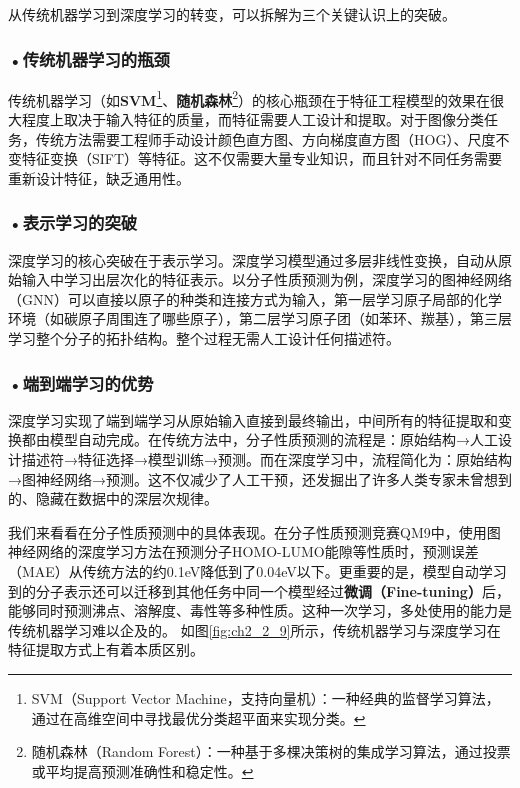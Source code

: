 从传统机器学习到深度学习的转变，可以拆解为三个关键认识上的突破。

\subsubsection*{\textbf{•传统机器学习的瓶颈}}

传统机器学习（如\textbf{SVM}\footnote{SVM（Support Vector Machine，支持向量机）：一种经典的监督学习算法，通过在高维空间中寻找最优分类超平面来实现分类。}、\textbf{随机森林}\footnote{随机森林（Random Forest）：一种基于多棵决策树的集成学习算法，通过投票或平均提高预测准确性和稳定性。}）的核心瓶颈在于特征工程模型的效果在很大程度上取决于输入特征的质量，而特征需要人工设计和提取。对于图像分类任务，传统方法需要工程师手动设计颜色直方图、方向梯度直方图（HOG）、尺度不变特征变换（SIFT）等特征。这不仅需要大量专业知识，而且针对不同任务需要重新设计特征，缺乏通用性。

\subsubsection*{\textbf{•表示学习的突破}}

深度学习的核心突破在于表示学习。深度学习模型通过多层非线性变换，自动从原始输入中学习出层次化的特征表示。以分子性质预测为例，深度学习的图神经网络（GNN）可以直接以原子的种类和连接方式为输入，第一层学习原子局部的化学环境（如碳原子周围连了哪些原子），第二层学习原子团（如苯环、羰基），第三层学习整个分子的拓扑结构。整个过程无需人工设计任何描述符。

\subsubsection*{\textbf{•端到端学习的优势}}

深度学习实现了端到端学习从原始输入直接到最终输出，中间所有的特征提取和变换都由模型自动完成。在传统方法中，分子性质预测的流程是：原始结构→人工设计描述符→特征选择→模型训练→预测。而在深度学习中，流程简化为：原始结构→图神经网络→预测。这不仅减少了人工干预，还发掘出了许多人类专家未曾想到的、隐藏在数据中的深层次规律。

我们来看看在分子性质预测中的具体表现。在分子性质预测竞赛QM9中，使用图神经网络的深度学习方法在预测分子HOMO-LUMO能隙等性质时，预测误差（MAE）从传统方法的约0.1eV降低到了0.04eV以下。更重要的是，模型自动学习到的分子表示还可以迁移到其他任务中同一个模型经过\textbf{微调（Fine-tuning）}后，能够同时预测沸点、溶解度、毒性等多种性质。这种一次学习，多处使用的能力是传统机器学习难以企及的。
如图\ref{fig:ch2_2_9}所示，传统机器学习与深度学习在特征提取方式上有着本质区别。

